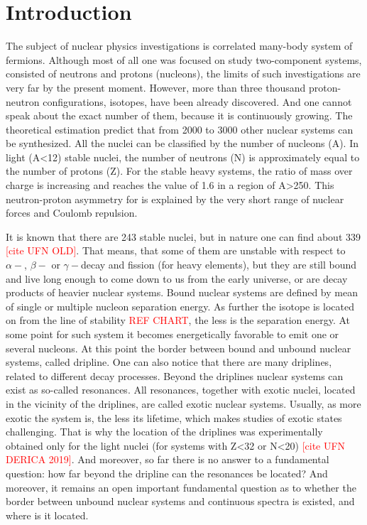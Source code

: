 \section{Introduction}

The subject of nuclear physics investigations is correlated many-body system of fermions. 
Although most of all one was focused on study two-component systems, consisted of neutrons and protons (nucleons), the limits of such investigations are very far by the present moment.
However, more than three thousand proton-neutron configurations, isotopes, have been already discovered.
And one cannot speak about the exact number of them, because it is continuously growing. 
The theoretical estimation predict that from 2000 to 3000 other nuclear systems can be synthesized.  
All the nuclei can be classified by the number of nucleons (A). 
In light (A<12) stable nuclei, the number of neutrons (N) is approximately equal to the number of protons (Z). 
For the stable heavy systems, the ratio of mass over charge is increasing and reaches the value of 1.6 in a region of A>250. 
This neutron-proton asymmetry for is explained by the very short range of nuclear forces and Coulomb repulsion.

It is known that there are 243 stable nuclei, but in nature one can find about 339 \textcolor{red}{[cite UFN OLD]}. 
That means, that some of them are unstable with respect to $\alpha-$, $\beta-$ or $\gamma-$decay and fission (for heavy elements), but they are still bound and live long enough to come down to us from the early universe, or are decay products of heavier nuclear systems. 
Bound nuclear systems are defined by mean of single or multiple nucleon separation energy.
As further the isotope is located on from the line of stability \textcolor{red}{REF CHART}, the less is the separation energy.
At some point for such system it becomes energetically favorable to emit one or several nucleons.
At this point the border between bound and unbound nuclear systems, called dripline.
One can also notice that there are many driplines, related to different decay processes.
Beyond the driplines nuclear systems can exist as so-called resonances. 
All resonances, together with exotic nuclei, located in the vicinity of the driplines, are called exotic nuclear systems.
Usually, as more exotic the system is, the less its lifetime, which makes studies of exotic states challenging. 
That is why the location of the driplines was experimentally obtained only for the light nuclei (for systems with Z<32 or N<20) \textcolor{red}{[cite UFN DERICA 2019]}.
And moreover, so far there is no answer to a fundamental question: how far beyond the dripline can the resonances be located? 
And moreover, it remains an open important fundamental question as to whether the border between unbound nuclear systems and continuous spectra is existed, and where is it located.

